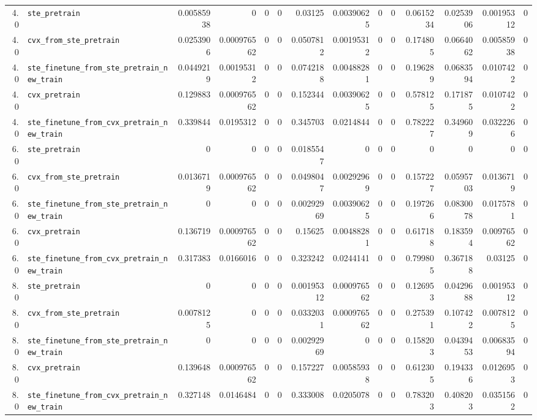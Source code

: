 \begin{longtable}{@{}r l *{12}{r}@{}}
4.0 & \texttt{ste\_pretrain} & 0.00585938 & 0 & 0 & 0 & 0.03125 & 0.00390625 & 0 & 0 & 0.0615234 & 0.0253906 & 0.00195312 & 0 \\
4.0 & \texttt{cvx\_from\_ste\_pretrain} & 0.0253906 & 0.000976562 & 0 & 0 & 0.0507812 & 0.00195312 & 0 & 0 & 0.174805 & 0.0664062 & 0.00585938 & 0 \\
4.0 & \texttt{ste\_finetune\_from\_ste\_pretrain\_new\_train} & 0.0449219 & 0.00195312 & 0 & 0 & 0.0742188 & 0.00488281 & 0 & 0 & 0.196289 & 0.0683594 & 0.0107422 & 0 \\
4.0 & \texttt{cvx\_pretrain} & 0.129883 & 0.000976562 & 0 & 0 & 0.152344 & 0.00390625 & 0 & 0 & 0.578125 & 0.171875 & 0.0107422 & 0 \\
4.0 & \texttt{ste\_finetune\_from\_cvx\_pretrain\_new\_train} & 0.339844 & 0.0195312 & 0 & 0 & 0.345703 & 0.0214844 & 0 & 0 & 0.782227 & 0.349609 & 0.0322266 & 0 \\
6.0 & \texttt{ste\_pretrain} & 0 & 0 & 0 & 0 & 0.0185547 & 0 & 0 & 0 & 0 & 0 & 0 & 0 \\
6.0 & \texttt{cvx\_from\_ste\_pretrain} & 0.0136719 & 0.000976562 & 0 & 0 & 0.0498047 & 0.00292969 & 0 & 0 & 0.157227 & 0.0595703 & 0.0136719 & 0 \\
6.0 & \texttt{ste\_finetune\_from\_ste\_pretrain\_new\_train} & 0 & 0 & 0 & 0 & 0.00292969 & 0.00390625 & 0 & 0 & 0.197266 & 0.0830078 & 0.0175781 & 0 \\
6.0 & \texttt{cvx\_pretrain} & 0.136719 & 0.000976562 & 0 & 0 & 0.15625 & 0.00488281 & 0 & 0 & 0.617188 & 0.183594 & 0.00976562 & 0 \\
6.0 & \texttt{ste\_finetune\_from\_cvx\_pretrain\_new\_train} & 0.317383 & 0.0166016 & 0 & 0 & 0.323242 & 0.0244141 & 0 & 0 & 0.799805 & 0.367188 & 0.03125 & 0 \\
8.0 & \texttt{ste\_pretrain} & 0 & 0 & 0 & 0 & 0.00195312 & 0.000976562 & 0 & 0 & 0.126953 & 0.0429688 & 0.00195312 & 0 \\
8.0 & \texttt{cvx\_from\_ste\_pretrain} & 0.0078125 & 0 & 0 & 0 & 0.0332031 & 0.000976562 & 0 & 0 & 0.275391 & 0.107422 & 0.0078125 & 0 \\
8.0 & \texttt{ste\_finetune\_from\_ste\_pretrain\_new\_train} & 0 & 0 & 0 & 0 & 0.00292969 & 0 & 0 & 0 & 0.158203 & 0.0439453 & 0.00683594 & 0 \\
8.0 & \texttt{cvx\_pretrain} & 0.139648 & 0.000976562 & 0 & 0 & 0.157227 & 0.00585938 & 0 & 0 & 0.612305 & 0.194336 & 0.0126953 & 0 \\
8.0 & \texttt{ste\_finetune\_from\_cvx\_pretrain\_new\_train} & 0.327148 & 0.0146484 & 0 & 0 & 0.333008 & 0.0205078 & 0 & 0 & 0.783203 & 0.408203 & 0.0351562 & 0 \\

\end{longtable}
